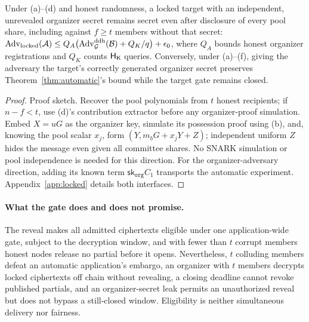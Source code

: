 \begin{theorem}
\label{thm:locked}
Under (a)--(d) and honest randomness, a locked target with an independent, unrevealed organizer secret remains secret even after disclosure of every pool share, including against $f\ge t$ members without that secret:
$\operatorname{Adv}_{\rm locked}(\mathcal{A})\le Q_A\bigl(\operatorname{Adv}^{\rm ddh}_{\mathcal{G}}(\mathcal{B})+Q_K/q\bigr)+\epsilon_0$,
where $Q_A$ bounds honest organizer registrations and $Q_K$ counts $\mathsf{H}_{\mathsf{K}}$ queries. Conversely, under (a)--(f), giving the adversary the target's correctly generated organizer secret preserves Theorem~\ref{thm:automatic}'s bound while the target gate remains closed.
\end{theorem}
\begin{proof}
Proof sketch.
Recover the pool polynomials from $t$ honest recipients; if $n-f<t$, use (d)'s contribution extractor before any organizer-proof simulation. Embed $X=uG$ as the organizer key, simulate its possession proof using (b), and, knowing the pool scalar $x_j$, form $(Y,m_bG+x_jY+Z)$; independent uniform $Z$ hides the message even given all committee shares. No SNARK simulation or pool independence is needed for this direction. For the organizer-adversary direction, adding its known term $\mathsf{sk}_{\mathtt{org}}C_1$ transports the automatic experiment. Appendix~\ref{app:locked} details both interfaces.
\end{proof}

\paragraph{What the gate does and does not promise.}
The reveal makes all admitted ciphertexts eligible under one application-wide gate, subject to the decryption window, and with fewer than $t$ corrupt members honest nodes release no partial before it opens. Nevertheless, $t$ colluding members defeat an automatic application's embargo, an organizer with $t$ members decrypts locked ciphertexts off chain without revealing, a closing deadline cannot revoke published partials, and an organizer-secret leak permits an unauthorized reveal but does not bypass a still-closed window. Eligibility is neither simultaneous delivery nor fairness.
